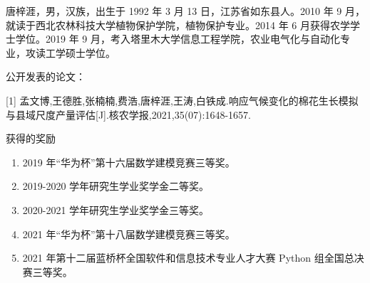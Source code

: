 \documentclass[a4paper,oneside,zihao=5,AutoFakeBold]{ctexbook}
\begin{document}
唐梓涯，男，汉族，出生于 1992 年 3 月 13 日，江苏省如东县人。2010 年 9 月，就读于西北农林科技大学植物保护学院，植物保护专业。2014 年 6 月获得农学学士学位。2019 年 9 月，考入塔里木大学信息工程学院，农业电气化与自动化专业，攻读工学硕士学位。

公开发表的论文：

[1] 孟文博,王德胜,张楠楠,费浩,唐梓涯,王涛,白铁成.响应气候变化的棉花生长模拟与县域尺度产量评估[J].核农学报,2021,35(07):1648-1657.

获得的奖励
\begin{enumerate}
  \item 2019 年“华为杯”第十六届数学建模竞赛三等奖。
  \item 2019-2020 学年研究生学业奖学金二等奖。
  \item 2020-2021 学年研究生学业奖学金三等奖。
  \item 2021 年“华为杯”第十八届数学建模竞赛三等奖。
  \item 2021 年第十二届蓝桥杯全国软件和信息技术专业人才大赛 Python 组全国总决赛三等奖。
\end{enumerate}

\appendix

\end{document}
